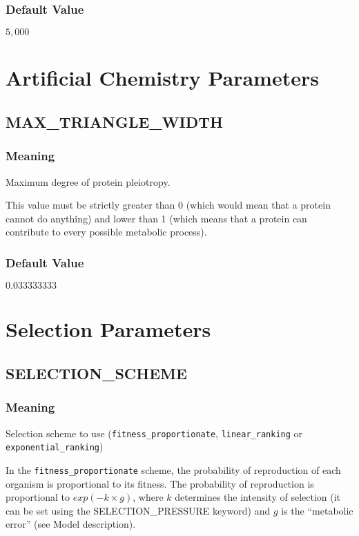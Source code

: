 \subsubsection{Default Value}
$5,000$



\section{Artificial Chemistry Parameters}

\subsection{MAX\_TRIANGLE\_WIDTH}
\subsubsection{Meaning}
Maximum degree of protein pleiotropy.

This value must be strictly greater than 0 (which would mean that a protein cannot do anything) and lower than 1 (which means that a protein can contribute to every possible metabolic process).
\subsubsection{Default Value}
$0.033333333$



\section{Selection Parameters}

\subsection{SELECTION\_SCHEME}
\subsubsection{Meaning}
Selection scheme to use (\verb?fitness_proportionate?, \verb?linear_ranking? or \verb?exponential_ranking?)

In the \verb?fitness_proportionate? scheme, the probability of reproduction of each organism is proportional to its fitness. The probability of reproduction is proportional to $exp(-k\times{}g)$, where $k$ determines the intensity of selection (it can be set using the SELECTION\_PRESSURE keyword) and $g$ is the ``metabolic error'' (see Model description).

